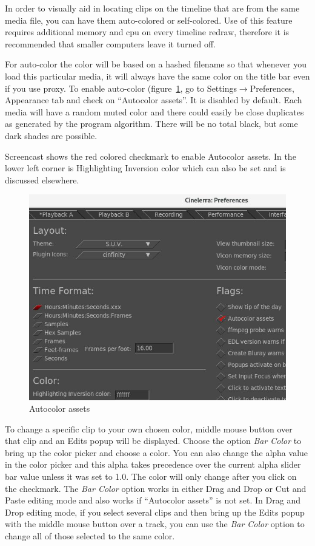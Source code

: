 In order to visually aid in locating clips on the timeline that are from the same media file, you can have them auto-colored or self-colored.  
Use of this feature requires additional memory and cpu on every timeline redraw, therefore it is recommended that smaller computers leave it turned off.

For auto-color the color will be based on a hashed filename so that whenever you load this particular media, it will always have the same color on the title bar even if you use proxy.  
To enable auto-color (figure~\ref{fig:autocolor_assets}, go to Settings$\rightarrow$Preferences, Appearance tab and check on “Autocolor assets”.  
It is disabled by default.  
Each media will have a random muted color and there could easily be close duplicates as generated by the program algorithm.  There will be no total black, but some dark shades are possible.  

Screencast shows the red colored checkmark to enable Autocolor assets.  
In the lower left corner is Highlighting Inversion color which can also be set and is discussed elsewhere.

\begin{figure}[htpb]
    \centering
    \includegraphics[width=0.8\linewidth]{images/autocolor-assets.png}
    \caption{Autocolor assets}
    \label{fig:autocolor_assets}
\end{figure}

To change a specific clip to your own chosen color, middle mouse button over that clip and an Edits popup will be displayed.  
Choose the option \emph{Bar Color} to bring up the color picker and choose a color.   
You can also change the alpha value in the color picker and this alpha takes precedence over the current alpha slider bar value unless it was set to 1.0.   
The color will only change after you click on the checkmark.  
The \emph{Bar Color} option works in either Drag and Drop or Cut and Paste editing mode and also works if “Autocolor assets” is not set.  
In Drag and Drop editing mode, if you select several clips and then bring up the Edits popup with the middle mouse button over a track, you can use the \emph{Bar Color} option to change all of those selected to the same color.

